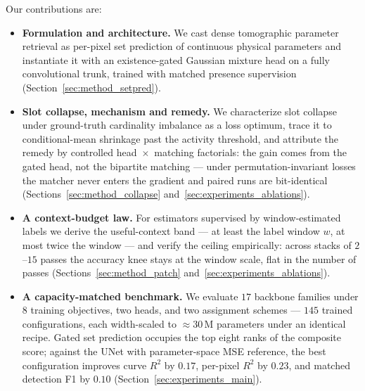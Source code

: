 Our contributions are:
\begin{itemize}
  \item \textbf{Formulation and architecture.} We cast dense tomographic parameter retrieval as per-pixel set prediction of continuous physical parameters and instantiate it with an existence-gated Gaussian mixture head on a fully convolutional trunk, trained with matched presence supervision (Section~\ref{sec:method_setpred}).
  \item \textbf{Slot collapse, mechanism and remedy.} We characterize slot collapse under ground-truth cardinality imbalance as a loss optimum, trace it to conditional-mean shrinkage past the activity threshold, and attribute the remedy by controlled head~$\times$~matching factorials: the gain comes from the gated head, not the bipartite matching --- under permutation-invariant losses the matcher never enters the gradient and paired runs are bit-identical (Sections~\ref{sec:method_collapse} and~\ref{sec:experiments_ablations}).
  \item \textbf{A context-budget law.} For estimators supervised by window-estimated labels we derive the useful-context band --- at least the label window $w$, at most twice the window --- and verify the ceiling empirically: across stacks of $2$--$15$ passes the accuracy knee stays at the window scale, flat in the number of passes (Sections~\ref{sec:method_patch} and~\ref{sec:experiments_ablations}).
  \item \textbf{A capacity-matched benchmark.} We evaluate $17$ backbone families under $8$ training objectives, two heads, and two assignment schemes --- $145$ trained configurations, each width-scaled to ${\approx}30$\,M parameters under an identical recipe. Gated set prediction occupies the top eight ranks of the composite score; against the UNet with parameter-space MSE reference, the best configuration improves curve $R^2$ by $0.17$, per-pixel $R^2$ by $0.23$, and matched detection F1 by $0.10$ (Section~\ref{sec:experiments_main}). 
\end{itemize}

